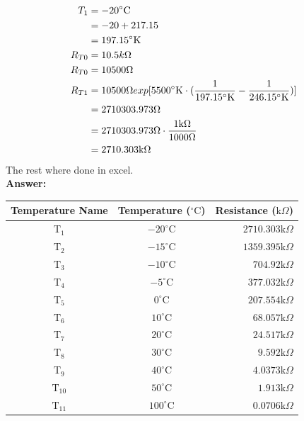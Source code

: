\documentclass{article}
\begin{document}
\begin{itemize}
\begin{align*}
			T_1 &= -20 ^{\circ} \text{C} \\
				&= -20 + 217.15 \\
				&= 197.15 ^{\circ} \text{K} \\
			R_{T0} &= 10.5 k \Omega \\
			R_{T0} &= 10500 \Omega \\
			R_{T1} &= 10500 \Omega exp[5500 ^{\circ} \text{K} \cdot ( { 1 \over 197.15 ^{\circ} \text{K}} - { 1 \over 246.15 ^{\circ} \text{K}} )] \\
				&= 2710303.973 \Omega \\
				&= 2710303.973 \Omega \cdot { 1 \text{k} \Omega \over 1000 \Omega } \\
				&= 2710.303 \text{k} \Omega
		\end{align*}
		The rest where done in excel. \\
		\textbf{Answer:} \\
		\begin{table}[H]
			\begin{tabular}{ | c | c | r | }
			\hline
			Temperature Name &
			Temperature ($^{\circ} \text{C}$) &
			Resistance ($\text{k} \Omega$) \\
			\hline
			$\text{T}_{1}$ & $-20 ^{\circ} \text{C}$ & $2710.303 \text{k} \Omega$ \\
			\hline
			$\text{T}_{2}$ & $-15 ^{\circ} \text{C}$ & $1359.395 \text{k} \Omega$ \\
			\hline
			$\text{T}_{3}$ & $-10 ^{\circ} \text{C}$ & $704.92 \text{k} \Omega$ \\
			\hline
			$\text{T}_{4}$ & $-5 ^{\circ} \text{C}$ & $377.032 \text{k} \Omega$ \\
			\hline
			$\text{T}_{5}$ & $0 ^{\circ} \text{C}$ & $207.554 \text{k} \Omega$ \\
			\hline
			$\text{T}_{6}$ & $10 ^{\circ} \text{C}$ & $68.057 \text{k} \Omega$ \\
			\hline
			$\text{T}_{7}$ & $20 ^{\circ} \text{C}$ & $24.517 \text{k} \Omega$ \\
			\hline
			$\text{T}_{8}$ & $30 ^{\circ} \text{C}$ & $9.592 \text{k} \Omega$ \\
			\hline
			$\text{T}_{9}$ & $40 ^{\circ} \text{C}$ & $4.0373 \text{k} \Omega$ \\
			\hline
			$\text{T}_{10}$ & $50 ^{\circ} \text{C}$ & $1.913 \text{k} \Omega$ \\
			\hline
			$\text{T}_{11}$ & $100 ^{\circ} \text{C}$ & $0.0706 \text{k} \Omega$ \\
			\hline
			\end{tabular}

\end{table}
\end{itemize}
\end{document}
